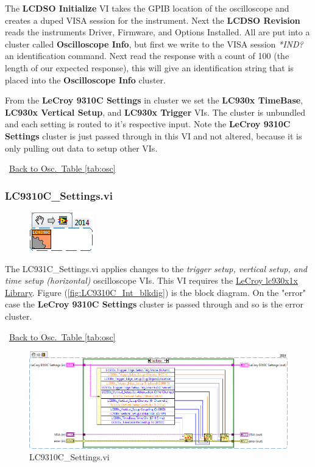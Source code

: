 \documentclass[11pt,a4paper,oldfontcommands]{memoir}
\begin{document}
The \textbf{LCDSO Initialize} VI takes the GPIB location of the oscilloscope and creates a duped VISA session for the instrument. Next the \textbf{LCDSO Revision} reads the instruments Driver, Firmware, and Options Installed. All are put into a cluster called \textbf{Oscilloscope Info}, but first we write to the VISA session \textit{*IND?} an identification command. Next read the response with a count of 100 (the length of our expected response), this will give an identification string that is placed into the \textbf{Oscilloscope Info} cluster.

From the \textbf{LeCroy 9310C Settings} in cluster we set the \textbf{LC930x TimeBase}, \textbf{LC930x Vertical Setup}, and \textbf{LC930x Trigger} VIs. The cluster is unbundled and each setting is routed to it's respective input. Note the \textbf{LeCroy 9310C Settings} cluster is just passed through in this VI and not altered, because it is only pulling out data to setup other VIs.

\noindent\hrulefill\, \hyperref[tab:osc]{Back to Osc.\ Table \ref{tab:osc}}

\subsubsection{LC9310C\_Settings.vi} \label{LC9310C_settings}
\noindent\hrulefill

\begin{figure}[h]
	\includegraphics[scale=0.625]{LC931C_settings_main_01}
	\label{fig:LC9310C_settings_main_01}
\end{figure}

The LC931C\_Settings.vi applies changes to the \textit{trigger setup, vertical setup, and time setup (horizontal)} oscilloscope VIs. This VI requires the \href{http://sine.ni.com/apps/utf8/niid_web_display.download_page?p_id_guid=E3B19B3E9608659CE034080020E74861}{LeCroy lc930x1x Library}. Figure (\ref{fig:LC9310C_Int_blkdig}) is the block diagram. On the "error" case the \textbf{LeCroy 9310C Settings} cluster is passed through and so is the error cluster.

\noindent\hrulefill\, \hyperref[tab:osc]{Back to Osc.\ Table \ref{tab:osc}}

\begin{figure}[H]
	\includegraphics[width=\textwidth,keepaspectratio]{LC931C_settings_blockdiagram_01}
	\caption{LC9310C\_Settings.vi}
	\label{fig:LC9310C_settings_blkdig_01}
\end{figure}
\end{document}
